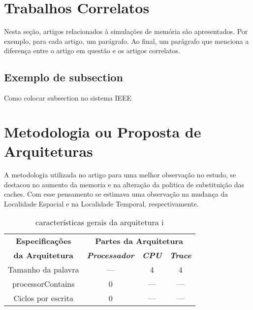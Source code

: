 \documentclass[conference]{IEEEtran}
\begin{document}
\section{Trabalhos Correlatos}

Nesta seção, artigos relacionados à simulações de memória são apresentados.
Por exemplo, para cada artigo, um parágrafo. Ao final, um parágrafo que menciona
a diferença entre o artigo em questão e os artigos correlatos.

\subsection{Exemplo de subsection}

Como colocar subsection no sistema IEEE

\section{Metodologia ou Proposta de Arquiteturas}


A metodologia utilizada no artigo para uma melhor observação no estudo, se destacou no aumento da memoria e na 
alteração da politica de substituição das caches. Com esse pensamento se estimava uma observação na mudança da 
Localidade Espacial e na Localidade Temporal, respectivamente.  

\setlength{\tabcolsep}{5pt}
\renewcommand{\arraystretch}{1.5}

\begin{table}[H]
  \caption{características gerais da arquitetura i}
  \begin{center}
      \begin{tabular}{|c|c|c|c|}
          \hline
          \textbf{Especificações} & \multicolumn{3}{|c|}{\textbf{Partes da Arquitetura}} \\
          \cline{2-4} 
          \textbf{da Arquitetura} & \textbf{\textit{Processador}}& \textbf{\textit{CPU}}& \textbf{\textit{Trace}} \\
          \hline
          Tamanho da palavra & --- & 4 & 4 \\
          \hline
          processorContains & 0 & --- & --- \\
          \hline
          Ciclos por escrita & 0 & --- & --- \\
          \hline
      \end{tabular}
      \label{tab1}
  \end{center}
\end{table}
\end{document}
